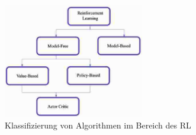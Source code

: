 \begin{figure}[htb]
    \centering
    \includegraphics[height=5cm]{lib/graphics/taxonomy of RL algorithms.png}
    \caption[Klassifizierung von Algorithmen im Bereich des RL]{Klassifizierung von Algorithmen im Bereich des RL\footnotemark}
    \label{abb:RL-algorithm-classification}
\end{figure}

